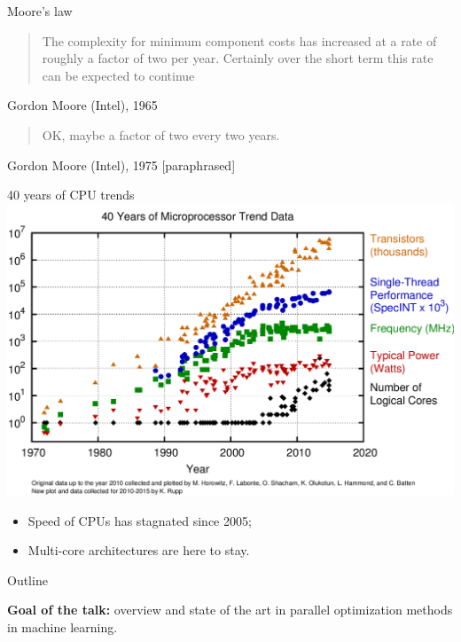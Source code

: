 \documentclass[10pt, notes]{beamer}
\begin{document}
\begin{frame}{Moore's law}
\begin{quote}
The complexity for minimum component costs 
has increased at a rate of roughly a factor of 
two per year. Certainly over the short term this 
rate can be expected to continue
\end{quote}
Gordon Moore (Intel), 1965

\hspace{1em}\begin{quote}
OK, maybe a factor of two every two 
years.
\end{quote}
Gordon Moore (Intel), 1975 [paraphrased]
\end{frame}


\begin{frame}{40 years of CPU trends}
\centering\includegraphics[width=0.8\linewidth]{img/moore_law}

\begin{itemize}[<+->]
\item Speed of CPUs has stagnated since 2005;
\item Multi-core architectures are here to stay.
\end{itemize}
\end{frame}


\begin{frame}{Outline}

{\bfseries Goal of the talk:} overview and state of the art in parallel optimization methods in machine learning.
\end{frame}
\end{document}
